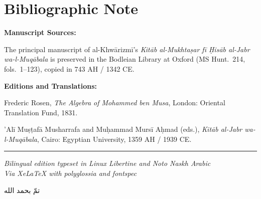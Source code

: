 \documentclass[11pt,a4paper]{book}
\begin{document}
\chapter*{Bibliographic Note}

\begin{small}
\textbf{Manuscript Sources:}

The principal manuscript of al-Khw\=arizm\={i}'s \textit{Kit\=ab al-Mukhta\d{s}ar
f\={i} \d{H}is\=ab al-Jabr wa-l-Muq\=abala} is preserved in the Bodleian
Library at Oxford (MS Hunt.~214, fols.~1--123), copied in 743 AH / 1342 CE.

\vspace{0.3cm}

\textbf{Editions and Translations:}

\begin{enumerate}[label={[\arabic*]},leftmargin=2em]
  \item Frederic Rosen, \textit{The Algebra of Mohammed ben Musa}, London:
  Oriental Translation Fund, 1831.
  \item 'Al\={i} Mu\d{s}\d{t}af\=a Musharrafa and Mu\d{h}ammad Murs\={i} A\d{h}mad
  (eds.), \textit{Kit\=ab al-Jabr wa-l-Muq\=abala}, Cairo: Egyptian
  University, 1359 AH / 1939 CE.
\end{enumerate}
\end{small}

\vfill

\begin{center}
\rule{0.3\textwidth}{0.4pt}

\vspace{0.3cm}

{\small\textit{Bilingual edition typeset in Linux Libertine and Noto Naskh Arabic}}\\[0.1cm]
{\small\textit{Via XeLaTeX with polyglossia and fontspec}}

\vspace{0.3cm}

\begin{Arabic}
تمّ بحمد الله
\end{Arabic}
\end{center}
\end{document}
